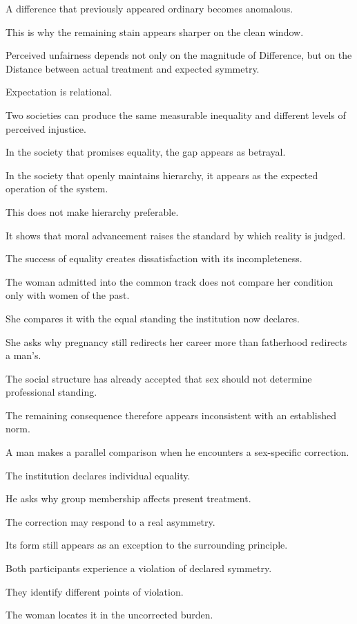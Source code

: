 A difference that previously appeared ordinary becomes anomalous.

This is why the remaining stain appears sharper on the clean window.

Perceived unfairness depends not only on the magnitude of Difference, but on the Distance between actual treatment and expected symmetry.

Expectation is relational.

Two societies can produce the same measurable inequality and different levels of perceived injustice.

In the society that promises equality, the gap appears as betrayal.

In the society that openly maintains hierarchy, it appears as the expected operation of the system.

This does not make hierarchy preferable.

It shows that moral advancement raises the standard by which reality is judged.

The success of equality creates dissatisfaction with its incompleteness.

The woman admitted into the common track does not compare her condition only with women of the past.

She compares it with the equal standing the institution now declares.

She asks why pregnancy still redirects her career more than fatherhood redirects a man’s.

The social structure has already accepted that sex should not determine professional standing.

The remaining consequence therefore appears inconsistent with an established norm.

A man makes a parallel comparison when he encounters a sex-specific correction.

The institution declares individual equality.

He asks why group membership affects present treatment.

The correction may respond to a real asymmetry.

Its form still appears as an exception to the surrounding principle.

Both participants experience a violation of declared symmetry.

They identify different points of violation.

The woman locates it in the uncorrected burden.

